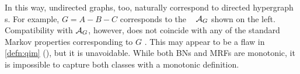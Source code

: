 In this way, undirected graphs, too, naturally correspond to directed hypergraph s.
For example, 
$G = A{-}B{-}C$
corresponds to the \hgraph\ 
\commentout{
\[
    \Ar_{G} = \Bigg\{
            \begin{array}{r@{}l} \{B\}&{\to}\{A\},\\ \{A,C\}&{\to}\{B\},\\ \{B\}&{\to}\{C\}
            \end{array}\Bigg\}
    =     \begin{tikzpicture}[center base]
        \node[dpad1] (A) at (-0.6,0) {$A$};
        \node[dpad1] (B) at (0,1) {$B$};
        \node[dpad1] (C) at (0.6,0) {$C$};

        \draw[arr2,<-] (A) -- (B);
        \draw[arr2,<-] (C) -- (B);
        \mergearr[arr2] ACB
    \end{tikzpicture}
    ~.
\]
}
$\mathcal A_G$ shown on the left.
% 
Compatibility
with $\mathcal A_G$, however, does not coincide with any of the standard Markov properties
corresponding to $G$
    \citep{KF09}.
%
This may appear to be a flaw in \cref{defn:qim} (\scibility), but it is unavoidable.  
While both BNs and MRFs are monotonic, it is impossible to capture both classes with a monotonic definition.

